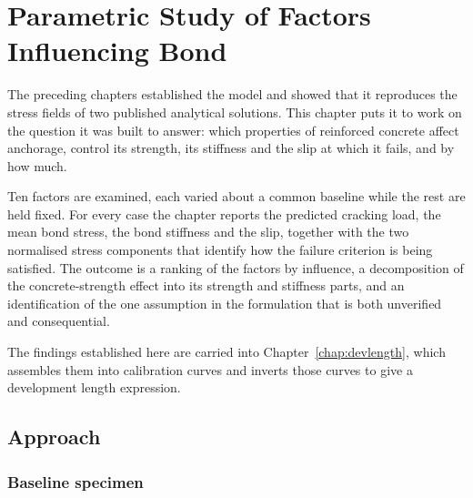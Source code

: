 %
%
%
%

\chapter{Parametric Study of Factors Influencing Bond}
\label{chap:parametric}

The preceding chapters established the model and showed that it reproduces
the stress fields of two published analytical solutions. This chapter puts
it to work on the question it was built to answer: which properties of reinforced concrete affect anchorage, control its strength, its stiffness and the slip at which it
fails, and by how much.
 
Ten factors are examined, each varied about a common baseline while the
rest are held fixed. For every case the chapter reports the predicted
cracking load, the mean bond stress, the bond stiffness and the slip,
together with the two normalised stress components that identify how the
failure criterion is being satisfied. The outcome is a ranking of the
factors by influence, a decomposition of the concrete-strength effect into
its strength and stiffness parts, and an identification of the one
assumption in the formulation that is both unverified and consequential.
 
The findings established here are carried into
Chapter~\ref{chap:devlength}, which assembles them into calibration curves
and inverts those curves to give a development length expression.


\newpage
\section{Approach}
\label{sec:factorsapproach}

\subsection{Baseline specimen}


